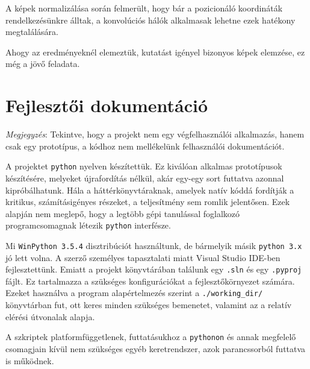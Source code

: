A képek normalizálása során felmerült, hogy bár a pozicionáló koordináták rendelkezésünkre 
álltak, a konvolúciós hálók alkalmasak lehetne ezek hatékony megtalálására.


Ahogy az eredményeknél elemeztük, kutatást igényel bizonyos képek elemzése,
ez még a jövő feladata.

%
%
%
%
%
%
%


\newpage
\section{Fejlesztői dokumentáció}


\textit{Megjegyzés}: Tekintve, hogy a projekt nem egy végfelhasználói alkalmazás, hanem 
csak egy prototípus, a kódhoz nem mellékelünk felhasználói dokumentációt.


A projektet \texttt{python} nyelven készítettük. Ez kiválóan alkalmas prototípusok készítésére,
melyeket újrafordítás nélkül, akár egy-egy sort futtatva azonnal kipróbálhatunk. Hála  a 
háttérkönyvtáraknak, amelyek natív kóddá fordítják a kritikus, számításigényes részeket,
a teljesítmény sem romlik jelentősen. Ezek alapján nem meglepő, hogy a legtöbb 
gépi tanulással foglalkozó programcsomagnak létezik \texttt{python} interfésze.


Mi \texttt{WinPython 3.5.4}\cite{winpython} disztribúciót használtunk, de bármelyik másik 
\texttt{python 3.x} jó lett volna. A szerző személyes tapasztalati miatt Visual Studio IDE-ben
fejlesztettünk. Emiatt a projekt könyvtárában találunk egy \texttt{.sln} és egy \texttt{.pyproj}
fájlt. Ez tartalmazza a szükséges konfigurációkat a fejlesztőkörnyezet számára.	Ezeket használva
a program alapértelmezés szerint a \texttt{./working\_dir/} könyvtárban fut, ott keres
minden szükséges bemenetet, valamint az a relatív elérési útvonalak alapja.


A szkriptek platformfüggetlenek, futtatásukhoz a \texttt{pythonon} és annak megfelelő csomagjain 
kívül nem szükséges egyéb keretrendszer, azok parancssorból futtatva is működnek.


